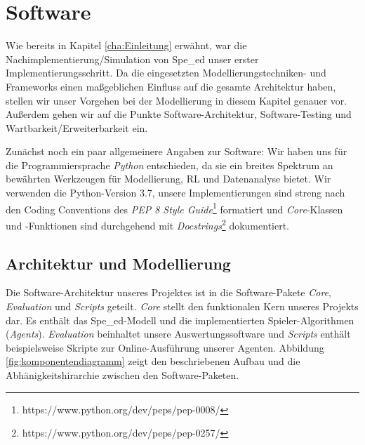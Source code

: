 \chapter{Software}
\label{cha:software}

Wie bereits in Kapitel \ref{cha:Einleitung} erwähnt, war die Nachimplementierung/Simulation von Spe\_ed unser erster Implementierungsschritt. Da die eingesetzten Modellierungstechniken- und Frameworks einen maßgeblichen Einfluss auf die gesamte Architektur haben, stellen wir unser Vorgehen bei der Modellierung in diesem Kapitel genauer vor. Außerdem gehen wir auf die Punkte Software-Architektur, Software-Testing und Wartbarkeit/Erweiterbarkeit ein.

Zunächst noch ein paar allgemeinere Angaben zur Software: Wir haben uns für die Programmiersprache \textit{Python} entschieden, da sie ein breites Spektrum an bewährten Werkzeugen für Modellierung, \acrshort{RL} und Datenanalyse bietet. Wir verwenden die Python-Version 3.7, unsere Implementierungen sind streng nach den Coding Conventions des \textit{PEP 8 Style Guide}\footnote{https://www.python.org/dev/peps/pep-0008/} formatiert und \textit{Core}-Klassen und -Funktionen sind durchgehend mit \textit{Docstrings}\footnote{https://www.python.org/dev/peps/pep-0257/} dokumentiert.

\section{Architektur und Modellierung}
\label{sec:modellierung}

Die Software-Architektur unseres Projektes ist in die Software-Pakete \textit{Core}, \textit{Evaluation} und \textit{Scripts} geteilt. \textit{Core} stellt den funktionalen Kern unseres Projekts dar. Es enthält das Spe\_ed-Modell und die implementierten Spieler-Algorithmen (\textit{Agents}). \textit{Evaluation} beinhaltet unsere Auswertungssoftware und \textit{Scripts} enthält beispielsweise Skripte zur Online-Ausführung unserer Agenten. Abbildung \ref{fig:komponentendiagramm} zeigt den beschriebenen Aufbau und die Abhänigkeitshirarchie zwischen den Software-Paketen.

